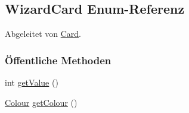\hypertarget{a00070}{\subsection{Wizard\-Card Enum-\/\-Referenz}
\label{a00070}
}


Abgeleitet von \hyperlink{a00054}{Card}.

\subsubsection*{Öffentliche Methoden}
\begin{DoxyCompactItemize}
\item 
int \hyperlink{a00070_aae714dc01fe7f5bb1a175d0d1068bb92}{get\-Value} ()
\item 
\hyperlink{a00058}{Colour} \hyperlink{a00070_abdfd7d21358d1587d6383603fa77037b}{get\-Colour} ()
\end{DoxyCompactItemize}
